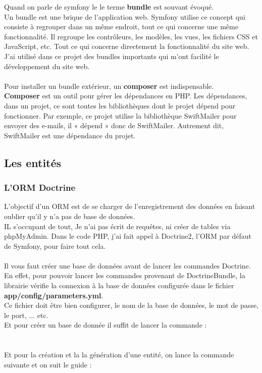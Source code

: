 \documentclass[12pt]{article}
\begin{document}
Quand on parle de symfony le le terme \textbf{bundle} est souvant évoqué.\\
Un bundle est une brique de  l'application web. Symfony utilise ce concept  qui consiste à regrouper dans un même endroit,  tout ce qui concerne une même fonctionnalité.
Il regroupe les contrôleurs, les modèles, les vues, les fichiers CSS et JavaScript, etc. Tout ce qui concerne directement la fonctionnalité  du site web.\\
J'ai utilisé dans ce projet des bundles importants qui m'ont facilité le développement du site web.\\ \\

Pour installer un bundle extérieur, un \textbf{composer} est indispensable.\\
\textbf{Composer} est un outil pour gérer les dépendances en PHP. Les dépendances, dans un projet, ce sont toutes les bibliothèques dont le projet dépend pour fonctionner. Par exemple, ce  projet utilise la bibliothèque SwiftMailer pour envoyer des e-mails, il « dépend » donc de SwiftMailer. Autrement dit, SwiftMailer est une dépendance du projet.\\



\subsection{Les entités }

\subsubsection{L'ORM Doctrine}
L'objectif d'un ORM  est de se charger de l'enregistrement des  données en  faisant oublier qu'il y n'a pas de base de données. \\
IL s'occupant de tout, Je n'ai pas écrit de requêtes, ni créer de tables via phpMyAdmin. Dans le code PHP, j'ai  fait appel à Doctrine2, l'ORM par défaut de Symfony, pour faire tout cela.\\ \\

Il vous faut créer une base de données avant de lancer les commandes Doctrine.\\
 En effet, pour pouvoir lancer les commandes provenant de DoctrineBundle, la librairie vérifie la connexion à la base de données configurée dans le fichier \textbf{ app/config/parameters.yml}. \\
 Ce fichier doit être bien configurer, le nom de la base de données, le mot de passe, le port, ... etc.\\
 Et pour créer un base de donnée il suffit de lancer la commande :\\
 \\
 \\
 Et pour la création et la la génération d'une entité, on lance la commande suivante et on suit le guide :\\
 \\
 
\end{document}
